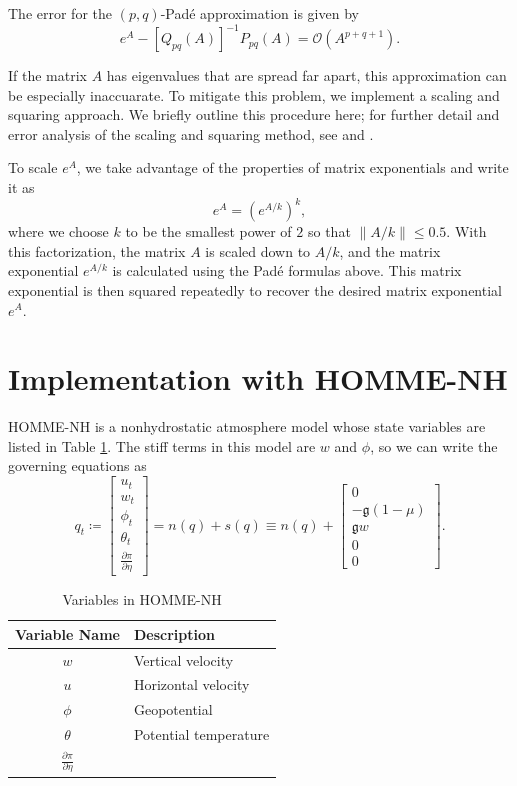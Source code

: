 \documentclass{csri19}
\newcommand{\CFKg}{\mathfrak{g}}
\begin{document}
The error for the $(p,q)$-Pad\'e approximation is given by
\[ e^A - \left[Q_{pq}(A)\right]^{-1}P_{pq}(A) = \mathcal{O}(A^{p+q+1}).\]

If the matrix $A$ has eigenvalues that are spread far apart, this 
approximation can be especially inaccuarate. To mitigate this problem, we 
implement a scaling and squaring approach. We briefly outline this 
procedure here; for further detail and error analysis of the scaling and 
squaring method, see \cite{CFK:higham2005} and \cite{CFK:Al-Mohy2009}. 

To scale $e^A$, we take advantage of the properties of matrix exponentials 
and write it as
\[e^{A} = \left(e^{A/k}\right)^k,\]
where we choose $k$ to be the smallest power of $2$ so that 
$\|A/k\| \leq 0.5$. With this factorization, the matrix $A$ is scaled down
 to $A/k$, and the matrix exponential $e^{A/k}$ is calculated using the 
Pad\'e formulas above. This matrix exponential is then squared repeatedly to 
recover the desired matrix exponential $e^{A}$.

\section{Implementation with HOMME-NH}\label{CFK:sec:homme}
HOMME-NH is a nonhydrostatic atmosphere model whose state variables are
listed in Table \ref{CFK:tab:variables}. The stiff terms in this model are 
$w$ and $\phi$, so we can write the governing equations as
\[q_t \coloneqq \begin{bmatrix} u_t \\
w_t\\
\phi_t\\
\theta_t\\
\frac{\partial \pi}{\partial \eta}
\end{bmatrix} = n(q) + s(q) \equiv n(q) + \begin{bmatrix}
0\\
-\CFKg (1-\mu)\\
\CFKg w\\
0\\
0\end{bmatrix}.\] 

\begin{table}[ht]
  \caption{Variables in HOMME-NH}
  \label{CFK:tab:variables}
  \begin{center}
    \begin{tabular}{|c|l|}
      \hline
      \textbf{Variable Name} & \textbf{Description} \\
      \hline
      $w$                                & Vertical velocity      \\
      $u$                                & Horizontal velocity    \\
      $\phi$                             & Geopotential           \\
      $\theta$                           & Potential temperature  \\
      $\frac{\partial\pi}{\partial\eta}$ &                        \\
      \hline
    \end{tabular}
  \end{center}
\end{table}
\end{document}
